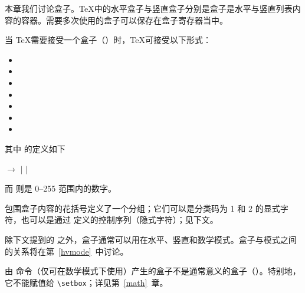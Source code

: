 \documentclass{book}
\begin{document}
本章我们讨论盒子。\TeX 中的水平盒子与竖直盒子分别是盒子是水平与竖直列表内容的容器。需要多次使用的盒子可以保存在盒子寄存器当中。

当 \TeX 需要接受一个盒子（）时，\TeX 可接受以下形式：
\begin{itemize}
\item {}\lb{}\rb
\item {}\lb{}\rb
\item {}\lb{}\rb
\item {}
\item {}
\item {}
\item {}
\end{itemize}
其中  的定义如下\label{box:spec}
\begin{disp} $\longrightarrow$ 
\nl\indent$|$  
         $|$  
\end{disp}
而  则是 0--255 范围内的数字。

包围盒子内容的花括号定义了一个分组；它们可以是分类码为 1 和 2 的显式字符，也可以是通过  定义的控制序列（隐式字符）；见下文。

除下文提到的  之外，盒子通常可以用在水平、竖直和数学模式。盒子与模式之间的关系将在第~\ref{hvmode}~中讨论。

由  命令（仅可在数学模式下使用）产生的盒子不是通常意义的盒子（）。特别地，它不能赋值给 \verb=\setbox=；详见第~\ref{math}~章。
\end{document}
